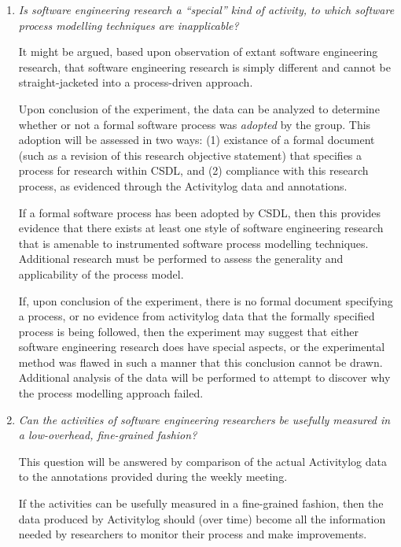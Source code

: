 \begin{enumerate}

\item {\em Is  software engineering research a ``special'' kind of
  activity, to which software process modelling techniques are inapplicable?}
  
  It might be argued, based upon observation of extant software engineering
  research, that software engineering research is simply different and
  cannot be straight-jacketed into a process-driven approach.
  
  Upon conclusion of the experiment, the data can be analyzed to
  determine whether or not a formal software process was {\em adopted} by
  the group.  This adoption will be assessed in two ways: (1) existance
  of a formal document (such as a revision of this research objective
  statement) that specifies a process for research within CSDL, and (2)
  compliance with this research process, as evidenced through the
  Activitylog data and annotations.
  
  If a formal software process has been adopted by CSDL, then this
  provides evidence that there exists at least one style of software
  engineering research that is amenable to instrumented software process
  modelling techniques.  Additional research must be performed to assess
  the generality and applicability of the process model.
  
  If, upon conclusion of the experiment, there is no formal document
  specifying a process, or no evidence from activitylog data that the
  formally specified process is being followed, then the experiment may
  suggest that either software engineering research does have special
  aspects, or the experimental method was flawed in such a manner that
  this conclusion cannot be drawn.  Additional analysis of the data will
  be performed to attempt to discover why the process modelling approach
  failed.
  
  
\item {\em Can the activities of software engineering researchers be
  usefully measured in a low-overhead, fine-grained fashion?}
  
  This question will be answered by comparison of the actual Activitylog
  data to the annotations provided during the weekly meeting.
  
  If the activities can be usefully measured in a fine-grained fashion,
  then the data produced by Activitylog should (over time) become all the
  information needed by researchers to monitor their process and make
  improvements.


\end{enumerate}
